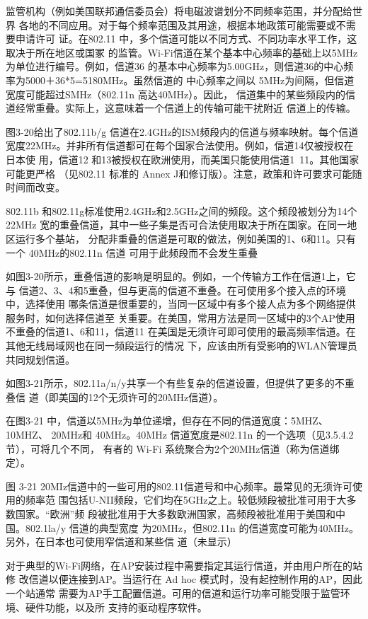 监管机构（例如美国联邦通信委员会）将电磁波谱划分不同频率范围，并分配给世界
各地的不同应用。对于每个频率范围及其用途，根据本地政策可能需要或不需要申请许可
证。在802.11 中，多个信道可能以不同方式、不同功率水平工作，这取决于所在地区或国冢
的监管。Wi-Fi信道在某个基本中心频率的基础上以5MHz为单位进行编号。例如，信道36
的基本中心频率为5.00GHz，则信道36的中心频率为5000＋36*5=5180MHz。虽然信道的
中心频率之间以 5MHz为间隔，但信道宽度可能超过SMHz（802.11n 高达40MHz）。因此，
信道集中的某些频段内的信道经常重叠。实际上，这意味着一个信道上的传输可能干扰附近
信道上的传输。

图3-20给出了802.11b/g 信道在2.4GHz的ISM频段内的信道与频率映射。每个信道
宽度22MHz。并非所有信道都可在每个国家合法使用。例如，信道14仅被授权在日本使
用，信道12 和13被授权在欧洲使用，而美国只能使用信道1~11。其他国家可能更严格
（见802.11 标准的 Annex J和修订版）。注意，政策和许可要求可能随时间而改变。

802.11b 和802.11g标准使用2.4GHz和2.5GHz之间的频段。这个频段被划分为14个 22MHz
宽的重叠信道，其中一些子集是否可合法使用取决于所在国家。在同一地区运行多个基站，
分配非重叠的信道是可取的做法，例如美国的1、6和11。只有一个 40MHz的802.11n 信道
可用于此频段而不会发生重叠

如图3-20所示，重叠信道的影响是明显的。例如，一个传输方工作在信道1上，它与
信道2、3、4和5重叠，但与更高的信道不重叠。在可使用多个接入点的环境中，选择使用
哪条信道是很重要的，当同一区域中有多个接人点为多个网络提供服务时，如何选择信道至
关重要。在美国，常用方法是同一区域中的3个AP使用不重叠的信道1、6和11，信道11
在美国是无须许可即可使用的最高频率信道。在其他无线局域网也在同一频段运行的情况
下，应该由所有受影响的WLAN管理员共同规划信道。

如图3-21所示，802.11a/n/y共享一个有些复杂的信道设置，但提供了更多的不重叠信
道（即美国的12个无须许可的20MHz信道）。

在图3-21 中，信道以5MHz为单位递增，但存在不同的信道宽度：5MHZ、10MHZ、
20MHz和 40MHz。40MHz 信道宽度是802.11n 的一个选项（见3.5.4.2节），可将几个不同，
有者的 Wi-Fi 系统聚合为2个20MHz信道（称为信道绑定）。


图 3-21
20MIz信道中的一些可用的802.11信道号和中心频率。最常见的无须许可使用的频率范
围包括U-NII频段，它们均在5GHz之上。较低频段被批准可用于大多数国家。“欧洲”频
段被批准用于大多数欧洲国家，高频段被批准用于美国和中国。802.1la/y 信道的典型宽度
为20MHz，但802.11n 的信道宽度可能为40MHz。另外，在日本也可使用窄信道和某些信
道（未显示）

对于典型的Wi-Fi网络，在AP安装过程中需要指定其运行信道，并由用户所在的站修
改信道以便连接到AP。当运行在 Ad hoc 模式时，没有起控制作用的AP，因此一个站通常
需要为AP手工配置信道。可用的信道和运行功率可能受限于监管环境、硬件功能，以及所
支持的驱动程序软件。

